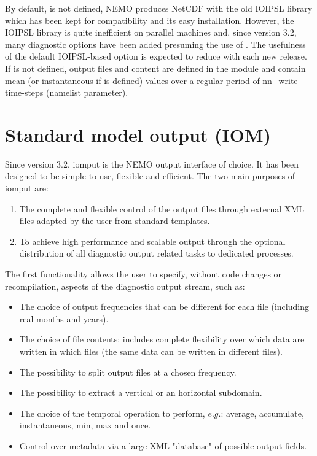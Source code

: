 \documentclass[../tex_main/NEMO_manual]{subfiles}
\begin{document}
By default,  is not defined,
NEMO produces NetCDF with the old IOIPSL library which has been kept for compatibility and its easy installation.
However, the IOIPSL library is quite inefficient on parallel machines and, since version 3.2,
many diagnostic options have been added presuming the use of .
The usefulness of the default IOIPSL-based option is expected to reduce with each new release.
If  is not defined, output files and content are defined in the  module and
contain mean (or instantaneous if  is defined) values over a regular period of
nn\_write time-steps (namelist parameter). 


\section{Standard model output (IOM)}
\label{sec:DIA_iom}

Since version 3.2, iomput is the NEMO output interface of choice.
It has been designed to be simple to use, flexible and efficient.
The two main purposes of iomput are: 

\begin{enumerate}
\item
  The complete and flexible control of the output files through external XML files adapted by
  the user from standard templates.
\item
  To achieve high performance and scalable output through the optional distribution of
  all diagnostic output related tasks to dedicated processes.
\end{enumerate}

The first functionality allows the user to specify, without code changes or recompilation, 
aspects of the diagnostic output stream, such as:

\begin{itemize}
\item
  The choice of output frequencies that can be different for each file (including real months and years).
\item
  The choice of file contents; includes complete flexibility over which data are written in which files
  (the same data can be written in different files).
\item
  The possibility to split output files at a chosen frequency.
\item
  The possibility to extract a vertical or an horizontal subdomain.
\item
  The choice of the temporal operation to perform, $e.g.$: average, accumulate, instantaneous, min, max and once.
\item
  Control over metadata via a large XML "database" of possible output fields.
\end{itemize}
\end{document}
